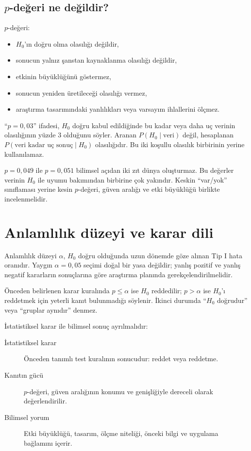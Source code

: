 \subsection{$p$-değeri ne değildir?}

$p$-değeri:

\begin{itemize}
  \item $H_0$'ın doğru olma olasılığı değildir,
  \item sonucun yalnız şanstan kaynaklanma olasılığı değildir,
  \item etkinin büyüklüğünü göstermez,
  \item sonucun yeniden üretileceği olasılığı vermez,
  \item araştırma tasarımındaki yanlılıkları veya varsayım ihlallerini ölçmez.
\end{itemize}

``$p=0{,}03$'' ifadesi, $H_0$ doğru kabul edildiğinde bu kadar veya daha uç
verinin olasılığının yüzde 3 olduğunu söyler. Aranan $P(H_0\mid\text{veri})$
değil, hesaplanan $P(\text{veri kadar uç sonuç}\mid H_0)$ olasılığıdır. Bu iki
koşullu olasılık birbirinin yerine kullanılamaz.

\begin{mistakebox}
$p=0{,}049$ ile $p=0{,}051$ bilimsel açıdan iki zıt dünya oluşturmaz. Bu
değerler verinin $H_0$ ile uyumu bakımından birbirine çok yakındır. Keskin
``var/yok'' sınıflaması yerine kesin $p$-değeri, güven aralığı ve etki
büyüklüğü birlikte incelenmelidir.
\end{mistakebox}

\section{Anlamlılık düzeyi ve karar dili}

Anlamlılık düzeyi $\alpha$, $H_0$ doğru olduğunda uzun dönemde göze alınan Tip
I hata oranıdır. Yaygın $\alpha=0{,}05$ seçimi doğal bir yasa değildir;
yanlış pozitif ve yanlış negatif kararların sonuçlarına göre araştırma
planında gerekçelendirilmelidir.

Önceden belirlenen karar kuralında $p\leq\alpha$ ise $H_0$ reddedilir;
$p>\alpha$ ise $H_0$'ı reddetmek için yeterli kanıt bulunmadığı söylenir.
İkinci durumda ``$H_0$ doğrudur'' veya ``gruplar aynıdır'' denmez.

İstatistiksel karar ile bilimsel sonuç ayrılmalıdır:

\begin{description}
  \item[İstatistiksel karar] Önceden tanımlı test kuralının sonucudur: reddet veya reddetme.
  \item[Kanıtın gücü] $p$-değeri, güven aralığının konumu ve genişliğiyle dereceli olarak değerlendirilir.
  \item[Bilimsel yorum] Etki büyüklüğü, tasarım, ölçme niteliği, önceki bilgi ve uygulama bağlamını içerir.
\end{description}


